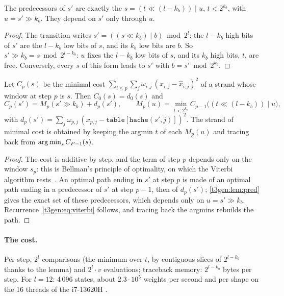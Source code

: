 \begin{lemme}\label{t3gen:lem:pred}
The predecessors of $s'$ are exactly the $s = (t \ll (l - k_b)) \mid u$, $t < 2^{k_b}$, with $u = s' \gg k_b$. They depend on $s'$ only through $u$.
\end{lemme}

\begin{proof}
The transition writes $s' = ((s \ll k_b) \mid b) \bmod 2^l$: the $l - k_b$ high bits of $s'$ are the $l - k_b$ low bits of $s$, and its $k_b$ low bits are $b$. So $s' \gg k_b = s \bmod 2^{l - k_b}$: $u$ fixes the $l - k_b$ low bits of $s$, and its $k_b$ high bits, $t$, are free. Conversely, every $s$ of this form leads to $s'$ with $b = s' \bmod 2^{k_b}$.
\end{proof}

\begin{proposition}\label{t3gen:prop:viterbi}
Let $C_p(s)$ be the minimal cost $\sum_{i \le p}\sum_j \omega_{i,j}\,(x_{i,j} - \hat x_{i,j})^2$ of a strand whose window at step $p$ is $s$. Then $C_0(s) = d_0(s)$ and
\begin{equation}\label{t3gen:eq:viterbi}
C_p(s') = M_p(s' \gg k_b) + d_p(s'), \qquad M_p(u) = \min_{t < 2^{k_b}} C_{p-1}\bigl((t \ll (l - k_b)) \mid u\bigr),
\end{equation}
with $d_p(s') = \sum_j \omega_{p,j}\,(x_{p,j} - \texttt{table}[\texttt{hache}(s', j)])^2$. The strand of minimal cost is obtained by keeping the argmin $t$ of each $M_p(u)$ and tracing back from $\operatorname*{arg\,min}_s C_{P-1}(s)$.
\end{proposition}

\begin{proof}
The cost is additive by step, and the term of step $p$ depends only on the window $s_p$: this is Bellman's principle of optimality, on which the Viterbi algorithm rests~\cite{viterbi1967}. An optimal path ending in $s'$ at step $p$ is made of an optimal path ending in a predecessor of $s'$ at step $p-1$, then of $d_p(s')$; \cref{t3gen:lem:pred} gives the exact set of these predecessors, which depends only on $u = s' \gg k_b$. Recurrence~\eqref{t3gen:eq:viterbi} follows, and tracing back the argmins rebuilds the path.
\end{proof}

\paragraph{The cost.} Per step, $2^l$ comparisons (the minimum over $t$, by contiguous slices of $2^{l-k_b}$ thanks to the lemma) and $2^l \cdot v$ evaluations; traceback memory: $2^{l-k_b}$ bytes per step. For $l = 12$: 4\,096 states, about $2.3\cdot10^5$ weights per second and per shape on the 16 threads of the i7-13620H \mes.

